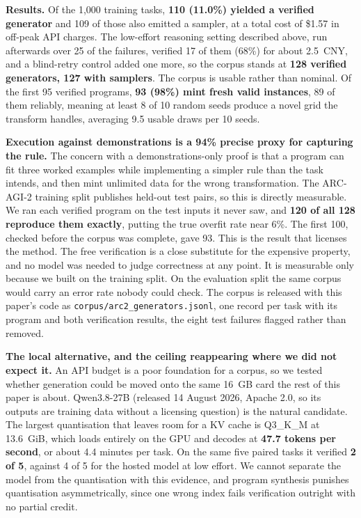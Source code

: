 \documentclass[11pt]{article}
\begin{document}
\textbf{Results.} Of the 1{,}000 training tasks, \textbf{110 (11.0\%) yielded a verified generator}
and 109 of those also emitted a sampler, at a total cost of \$1.57 in off-peak API charges. The
low-effort reasoning setting described above, run afterwards over 25 of the failures, verified 17 of
them (68\%) for about 2.5~CNY, and a blind-retry control added one more, so the corpus stands at
\textbf{128 verified generators, 127 with samplers}. The corpus
is usable rather than nominal. Of the first 95 verified programs, \textbf{93 (98\%) mint fresh valid
instances}, 89 of them reliably, meaning at least 8 of 10 random seeds produce a novel grid the
transform handles, averaging 9.5 usable draws per 10 seeds.

\textbf{Execution against demonstrations is a 94\% precise proxy for capturing the rule.} The concern
with a demonstrations-only proof is that a program can fit three worked examples while implementing a
simpler rule than the task intends, and then mint unlimited data for the wrong transformation. The
ARC-AGI-2 training split publishes held-out test pairs, so this is directly measurable. We ran each
verified program on the test inputs it never saw, and \textbf{120 of all 128 reproduce them exactly},
putting the true overfit rate near 6\%. The first 100, checked before the corpus was complete, gave 93. This is the result that licenses the method. The free
verification is a close substitute for the expensive property, and no model was needed to judge
correctness at any point. It is measurable only because we built on the training split. On the
evaluation split the same corpus would carry an error rate nobody could check. The corpus is
released with this paper's code as \texttt{corpus/arc2\_generators.jsonl}, one record per task with
its program and both verification results, the eight test failures flagged rather than removed.

\textbf{The local alternative, and the ceiling reappearing where we did not expect it.} An API
budget is a poor foundation for a corpus, so we tested whether generation could be moved onto the
same 16~GB card the rest of this paper is about. Qwen3.8-27B (released 14 August 2026, Apache 2.0,
so its outputs are training data without a licensing question) is the natural candidate. The largest
quantisation that leaves room for a KV cache is Q3\_K\_M at 13.6~GiB, which loads entirely on the GPU
and decodes at \textbf{47.7 tokens per second}, or about 4.4 minutes per task. On the same five
paired tasks it verified \textbf{2 of 5}, against 4 of 5 for the hosted model at low effort. We
cannot separate the model from the quantisation with this evidence, and program synthesis punishes
quantisation asymmetrically, since one wrong index fails verification outright with no partial
credit.
\end{document}
